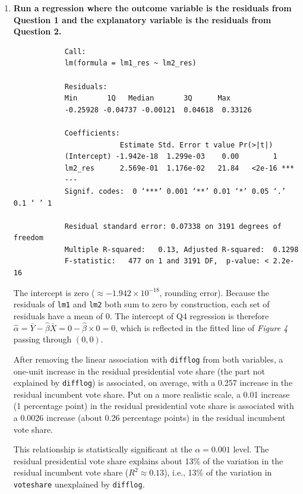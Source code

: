 \documentclass[12pt,letterpaper]{article}
\begin{document}
	\begin{enumerate}
		\item \textbf{Run a regression where the outcome variable is the residuals from Question 1 and the explanatory variable is the residuals from Question 2.}
		
		
		\begin{verbatim}
			Call:
			lm(formula = lm1_res ~ lm2_res)
			
			Residuals:
			Min       1Q   Median       3Q      Max 
			-0.25928 -0.04737 -0.00121  0.04618  0.33126 
			
			Coefficients:
			             Estimate Std. Error t value Pr(>|t|)    
			(Intercept) -1.942e-18  1.299e-03    0.00        1    
			lm2_res      2.569e-01  1.176e-02   21.84   <2e-16 ***
			---
			Signif. codes:  0 ‘***’ 0.001 ‘**’ 0.01 ‘*’ 0.05 ‘.’ 0.1 ‘ ’ 1
			
			Residual standard error: 0.07338 on 3191 degrees of freedom
			Multiple R-squared:   0.13,	Adjusted R-squared:  0.1298 
			F-statistic:   477 on 1 and 3191 DF,  p-value: < 2.2e-16
		\end{verbatim}
		
		\noindent The intercept is zero ($\approx -1.942 \times 10^{-18}$, rounding error). Because the residuals of \texttt{lm1} and \texttt{lm2} both sum to zero by construction, each set of residuals have a mean of 0. The intercept of Q4 regression is therefore $\hat\alpha = \bar{Y} - \hat\beta\bar{X} = 0 - \hat\beta \times 0 = 0$, which is reflected in the fitted line of \textit{Figure 4} passing through $(0, 0)$.
		
		\noindent After removing the linear association with \texttt{difflog} from both
		variables, a one-unit increase in the residual presidential vote share (the part
		not explained by \texttt{difflog}) is associated, on average, with a 0.257
		increase in the residual incumbent vote share. Put on a more realistic scale, a
		0.01 increase (1 percentage point) in the residual presidential vote share is
		associated with a 0.0026 increase (about 0.26 percentage points) in the residual
		incumbent vote share. 
		
		\noindent This relationship is statistically significant at the
		$\alpha = 0.001$ level. The residual presidential vote share
		explains about 13\% of the variation in the residual incumbent vote share
		($R^2 \approx 0.13$), i.e., 13\% of the variation in \texttt{voteshare} unexplained by
		\texttt{difflog}. \\
		

\end{enumerate}
\end{document}
